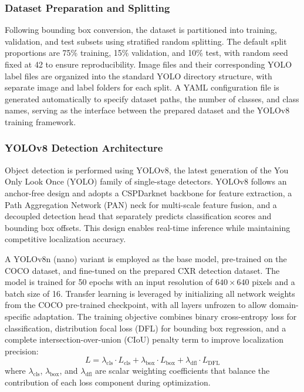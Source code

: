 \subsubsection{Dataset Preparation and Splitting}
Following bounding box conversion, the dataset is partitioned into training, validation, and test subsets using stratified random splitting. The default split proportions are 75\% training, 15\% validation, and 10\% test, with random seed fixed at 42 to ensure reproducibility. Image files and their corresponding YOLO label files are organized into the standard YOLO directory structure, with separate image and label folders for each split. A YAML configuration file is generated automatically to specify dataset paths, the number of classes, and class names, serving as the interface between the prepared dataset and the YOLOv8 training framework.

\subsubsection{YOLOv8 Detection Architecture}
Object detection is performed using YOLOv8, the latest generation of the You Only Look Once (YOLO) family of single-stage detectors. YOLOv8 follows an anchor-free design and adopts a CSPDarknet backbone for feature extraction, a Path Aggregation Network (PAN) neck for multi-scale feature fusion, and a decoupled detection head that separately predicts classification scores and bounding box offsets. This design enables real-time inference while maintaining competitive localization accuracy.

A YOLOv8n (nano) variant is employed as the base model, pre-trained on the COCO dataset, and fine-tuned on the prepared CXR detection dataset. The model is trained for 50 epochs with an input resolution of $640 \times 640$ pixels and a batch size of 16. Transfer learning is leveraged by initializing all network weights from the COCO pre-trained checkpoint, with all layers unfrozen to allow domain-specific adaptation. The training objective combines binary cross-entropy loss for classification, distribution focal loss (DFL) for bounding box regression, and a complete intersection-over-union (CIoU) penalty term to improve localization precision:
\begin{equation}
	L = \lambda_{\text{cls}} \cdot L_{\text{cls}} + \lambda_{\text{box}} \cdot L_{\text{box}} + \lambda_{\text{dfl}} \cdot L_{\text{DFL}}
\end{equation}
where $\lambda_{\text{cls}}$, $\lambda_{\text{box}}$, and $\lambda_{\text{dfl}}$ are scalar weighting coefficients that balance the contribution of each loss component during optimization.

